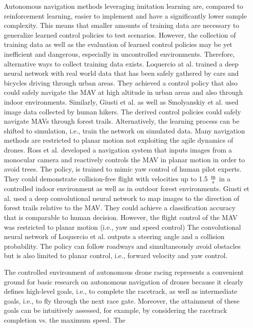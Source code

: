 Autonomous navigation methods leveraging imitation learning are,
compared to reinforcement learning, 
easier to implement and have a significantly lower sample complexity. 
This means that smaller amounts of training data 
are necessary to generalize learned control policies to test scenarios.
However, the collection of training data 
as well as the evaluation of learned control policies
may be yet inefficient and dangerous, especially in uncontrolled environments.
Therefore, alternative ways to collect training data exists.
Loquercio at al. \cite{Loquercio2018} trained a deep neural network 
with real world data that has been safely gathered by cars and 
bicycles driving through urban areas.
They achieved a control policy 
that also could safely navigate the MAV 
at high altitude in urban areas and also through indoor environments.
Similarly, Giusti et al. \cite{Giusti2016}
as well as Smolyanskiy et al. \cite{Smolyanskiy2017} 
used image data collected by human hikers.
The derived control policies could safely navigate MAVs through forest trails.
Alternatively, the learning process can be shifted to simulation,
i.e., train the network on simulated data.
Many navigation methods are restricted to planar motion 
not exploiting the agile dynamics of drones.
Ross et al. \cite{Ross2013}
developed a navigation system that inputs images from a monocular camera and
reactively controls the MAV in planar motion in order to avoid trees.
The policy, is trained to mimic yaw control of human pilot experts.
They could demonstrate collision-free flight with velocities up to 1.5 $\frac{\text m}{\text s}$
in a controlled indoor environment as well as in outdoor forest environments.
Giusti et al. \cite{Giusti2016}  used a deep convolutional neural network to map images
to the direction of forest trails relative to the MAV.
They could achieve a classification accuracy that is comparable to human decision.
However, the flight control of the MAV was restricted to planar motion (i.e., yaw and speed control)
The convolutional neural network of Loquercio et al. \cite{Loquercio2018}
outputs a steering angle and a collision probability.
The policy can follow roadways and simultaneously avoid obstacles
but is also limited to planar control, i.e., forward velocity and yaw control.


The controlled environment of autonomous drone racing 
represents a convenient ground
for basic research on autonomous navigation of drones
because it clearly defines high-level goals, 
i.e., to complete the racetrack,
as well as intermediate goals, i.e., to fly through the next race gate.
Moreover, the attainment of these goals can be intuitively assessed,
for example, by considering the racetrack completion vs. the 
maximum speed.
The 





